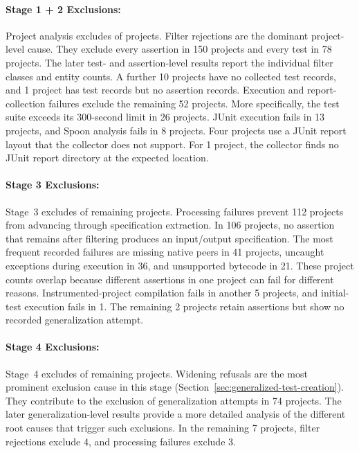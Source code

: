 

\paragraph{Stage 1 + 2 Exclusions:}

Project analysis excludes \TzRealworldStageOneTwoExcluded{} of
\TzRealworldStageOneTwoEntering{} projects.
Filter rejections are the dominant project-level cause.
They exclude every assertion in 150 projects and every test in 78 projects.
The later test- and assertion-level results report the individual filter classes and entity counts.
A further 10 projects have no collected test records,
and 1 project has test records but no assertion records.
Execution and report-collection failures exclude the remaining 52 projects.
More specifically, the \VariantOriginal{} test suite exceeds its 300-second limit in 26 projects.
JUnit execution fails in 13 projects, and Spoon analysis fails in 8 projects.
Four projects use a JUnit report layout that the collector does not support.
For 1 project, the collector finds no JUnit report directory at the expected location.

\paragraph{Stage 3 Exclusions:}

Stage~3 excludes \TzRealworldStageThreeExcluded{} of
\TzRealworldStageThreeEntering{} remaining projects.
Processing failures prevent 112 projects from advancing through specification extraction.
In 106 projects, no assertion that remains after filtering produces an input/output specification.
The most frequent recorded failures are missing \ToolJPF{} native peers in 41 projects,
uncaught exceptions during \ToolJPF{} execution in 36, and unsupported bytecode in 21.
These project counts overlap because different assertions in one project can fail for different reasons.
Instrumented-project compilation fails in another 5 projects,
and initial-test execution fails in 1.
The remaining 2 projects retain assertions but show no recorded generalization attempt.

\paragraph{Stage 4 Exclusions:}

Stage~4 excludes \TzRealworldStageFourExcluded{} of
\TzRealworldStageFourEntering{} remaining projects.
Widening refusals are the most prominent exclusion cause in this stage
(Section~\ref{sec:generalized-test-creation}).
They contribute to the exclusion of generalization attempts in 74 projects.
The later generalization-level results provide a more detailed
analysis of the different root causes that trigger such exclusions.
In the remaining 7 projects, filter rejections exclude 4,
and processing failures exclude 3.

